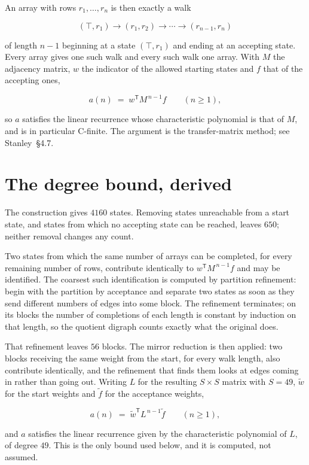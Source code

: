 \documentclass[11pt]{article}
\theoremstyle{definition}
\begin{document}
An array with rows $r_1,\dots,r_n$ is then exactly a walk

\[(\top,r_1) \to (r_1,r_2) \to \cdots \to (r_{n-1},r_n)\]

of length $n-1$ beginning at a state $(\top,r_1)$ and ending at an accepting state. Every array gives one such walk and every such walk one array. With $M$ the adjacency matrix, $w$ the indicator of the allowed starting states and $f$ that of the accepting ones,

\[a(n) \;=\; w^{\mathsf T} M^{\,n-1} f \qquad (n \ge 1),\]

so $a$ satisfies the linear recurrence whose characteristic polynomial is that of $M$, and is in particular C-finite. The argument is the transfer-matrix method; see Stanley~\S4.7.

\section{The degree bound, derived}

The construction gives $4160$ states. Removing states unreachable from a start state, and states from which no accepting state can be reached, leaves $650$; neither removal changes any count.

Two states from which the same number of arrays can be completed, for every remaining number of rows, contribute identically to $w^{\mathsf T}M^{\,n-1}f$ and may be identified. The coarsest such identification is computed by partition refinement: begin with the partition by acceptance and separate two states as soon as they send different numbers of edges into some block. The refinement terminates; on its blocks the number of completions of each length is constant by induction on that length, so the quotient digraph counts exactly what the original does.

That refinement leaves $56$ blocks. The mirror reduction is then applied: two blocks receiving the same weight from the start, for every walk length, also contribute identically, and the refinement that finds them looks at edges coming in rather than going out. Writing $L$ for the resulting $S \times S$ matrix with $S = 49$, $\tilde w$ for the start weights and $\tilde f$ for the acceptance weights,

\[a(n) \;=\; \tilde w^{\mathsf T} L^{\,n-1} \tilde f \qquad (n \ge 1),\]

and $a$ satisfies the linear recurrence given by the characteristic polynomial of $L$, of degree $49$. This is the only bound used below, and it is computed, not assumed.
\end{document}
